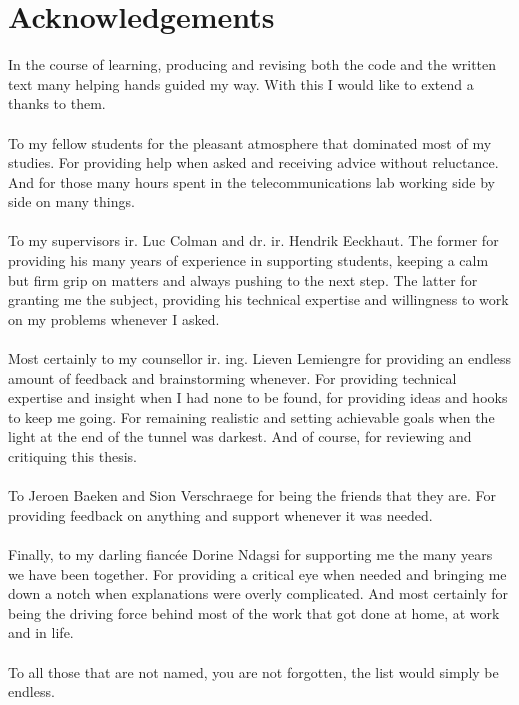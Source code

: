\documentclass[11pt,british]{article}
\begin{document}
\section*{Acknowledgements}
In the course of learning, producing and revising both the code and the written text many helping hands guided my way. With this I would like to extend a thanks to them.
\\
\\
To my fellow students for the pleasant atmosphere that dominated most of my studies. For providing help when asked and receiving advice without reluctance. And for those many hours spent in the telecommunications lab working side by side on many things.
\\
\\
To my supervisors ir. Luc Colman and dr. ir. Hendrik Eeckhaut. The former for providing his many years of experience in supporting students, keeping a calm but firm grip on matters and always pushing to the next step. The latter for granting me the subject, providing his technical expertise and willingness to work on my problems whenever I asked.
\\
\\
Most certainly to my counsellor ir. ing. Lieven Lemiengre for providing an endless amount of feedback and brainstorming whenever. For providing technical expertise and insight when I had none to be found, for providing ideas and hooks to keep me going. For remaining realistic and setting achievable goals when the light at the end of the tunnel was darkest. And of course, for reviewing and critiquing this thesis.
\\
\\
To Jeroen Baeken and Sion Verschraege for being the friends that they are. For providing feedback on anything and support whenever it was needed.
\\
\\
Finally, to my darling fianc\'{e}e Dorine Ndagsi for supporting me the many years we have been together. For providing a critical eye when needed and bringing me down a notch when explanations were overly complicated. And most certainly for being the driving force behind most of the work that got done at home, at work and in life.
\\
\\
To all those that are not named, you are not forgotten, the list would simply be endless.

\pagebreak{}

\end{document}
